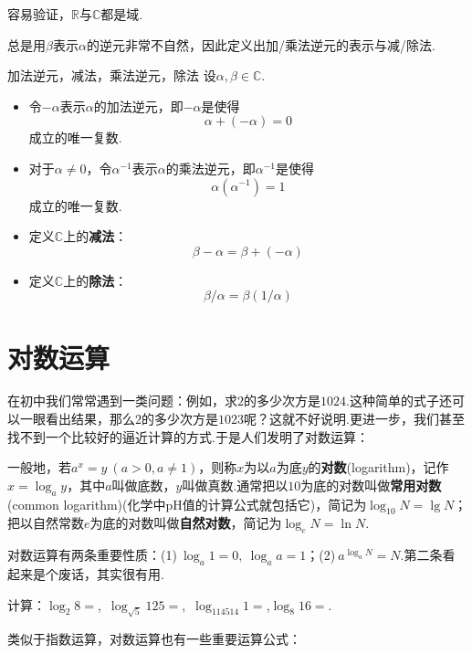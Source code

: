 \documentclass[lang=cn, zihao=4.5]{elegantbook}
\newcommand{\R}{\mathbb{R}}
\newcommand{\C}{\mathbb{C}}
\newcommand{\tk}{\uline{\hspace{4em}}}
\begin{document}
容易验证，$\R$与$\C$都是域.

总是用$\beta$表示$\alpha$的逆元非常不自然，因此定义出加/乘法逆元的表示与减/除法.

\begin{definition}{加法逆元，减法，乘法逆元，除法}
	设$\alpha , \beta \in \C $.
	\begin{itemize}
		\item 令$- \alpha$表示$\alpha$的加法逆元，即$-\alpha$是使得$$\alpha + (-\alpha) = 0$$成立的唯一复数.
		\item 对于$\alpha \neq 0$，令$\alpha ^{-1}$表示$\alpha$的乘法逆元，即$\alpha ^{-1}$是使得$$\alpha (\alpha ^{-1}) = 1$$成立的唯一复数.
		\item 定义$\C $上的\textbf{减法}：$$\beta - \alpha = \beta + (-\alpha)$$
		\item 定义$\C $上的\textbf{除法}：$$\beta / \alpha = \beta (1 / \alpha)$$
	\end{itemize}
\end{definition}

\newpage
\section{对数运算}

在初中我们常常遇到一类问题：例如，求$2$的多少次方是$1024$.这种简单的式子还可以一眼看出结果，那么$2$的多少次方是$1023$呢？这就不好说明.更进一步，我们甚至找不到一个比较好的逼近计算的方式.于是人们发明了对数运算：

一般地，若$a^x=y~(a>0,a \neq 1)$，则称$x$为以$a$为底$y$的\textbf{对数}(logarithm)，记作$x = \log_{a}{y}$，其中$a$叫做底数，$y$叫做真数.通常把以$10$为底的对数叫做\textbf{常用对数}(common logarithm)(化学中pH值的计算公式就包括它)，简记为$\log_{10}{N}=\lg N$；把以自然常数$e$为底的对数叫做\textbf{自然对数}，简记为$\log_{e}{N}=\ln N$.

对数运算有两条重要性质：(1)$~\log_{a}{1} = 0,~\log_{a}{a}=1$；(2)$~a^{\log_{a}{N}}=N$.第二条看起来是个废话，其实很有用.

\begin{example}
	计算：$\log_{2}{8}=$\tk ,~$\log_{\sqrt{5}}{125}=$\tk ,~$\log_{114514}{1}=$\tk ,$\log_{8}{16}=$\tk .
\end{example}

类似于指数运算，对数运算也有一些重要运算公式：
\end{document}
